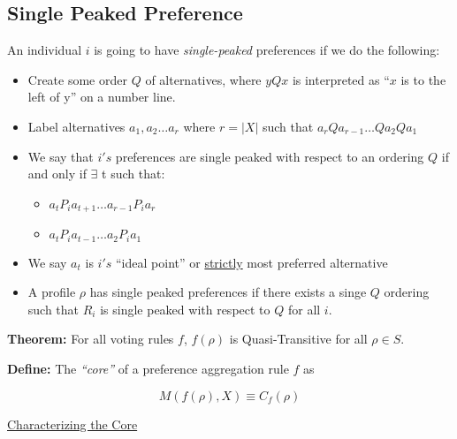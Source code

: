 \documentclass{article}
\newcommand{\Lm}{\mathcal{L}}
\begin{document}
\subsection*{Single Peaked Preference}

An individual $i$ is going to have \emph{single-peaked} preferences if we do the following:

\begin{itemize}

\item 
Create some order $Q$ of alternatives, where $yQx$ is interpreted as ``$x$ is to the left of y'' on a number line. 
\item Label alternatives $a_1,a_2 \dots a_r$ where $r = |X|$ such that $a_rQa_{r-1}\dots Qa_2Qa_1$
\item We say that $i's$ preferences are single peaked with respect to an ordering $Q$ if and only if $\exists$ t such that:
  \begin{itemize}
  
  \item $a_t P_i a_{t+1} \dots a_{r-1}P_ia_r$
  \item $a_t P_i a_{t-1} \dots a_{2}P_ia_1$
  \end{itemize} 
\item We say $a_t$ is $i's$ ``ideal point'' or \underline{strictly} most preferred alternative
\item A profile $\rho$ has single peaked preferences if there exists a singe $Q$ ordering such that $R_i$ is single peaked with respect to $Q$ for all $i$.
\end{itemize}

\bigskip

\textbf{Theorem:} For all voting rules $f$, $f(\rho)$ is Quasi-Transitive for all $\rho \in S$.

\bigskip

\textbf{Define:} The \emph{``core''} of a preference aggregation rule $f$ as 

\[
M(f(\rho), X) \equiv C_f(\rho)
\]

\underline{Characterizing the Core}


\end{document}
